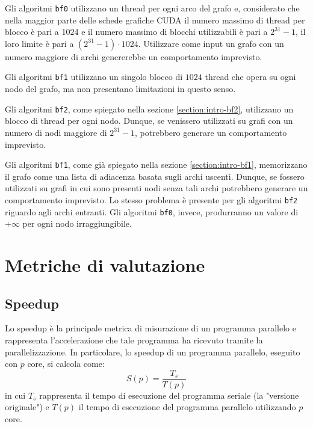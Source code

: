 \documentclass[12pt,a4paper,oneside]{book}
\begin{document}
	Gli algoritmi \texttt{bf0} utilizzano un thread per ogni arco del grafo e, considerato che nella maggior parte delle schede grafiche CUDA il numero massimo di thread per blocco è pari a 1024 e il numero massimo di blocchi utilizzabili è pari a $2^{31}-1$\cite{cudaSpecifications}, il loro limite è pari a $(2^{31}-1)\cdot 1024$. Utilizzare come input un grafo con un numero maggiore di archi genererebbe un comportamento imprevisto.
	
	Gli algoritmi \texttt{bf1} utilizzano un singolo blocco di $1024$ thread che opera su ogni nodo del grafo, ma non presentano limitazioni in questo senso.
	
	Gli algoritmi \texttt{bf2}, come spiegato nella sezione \ref{section:intro-bf2}, utilizzano un blocco di thread per ogni nodo. Dunque, se venissero utilizzati su grafi con un numero di nodi maggiore di $2^{31}-1$, potrebbero generare un comportamento imprevisto.
	
	Gli algoritmi \texttt{bf1}, come già spiegato nella sezione \ref{section:intro-bf1}, memorizzano il grafo come una lista di adiacenza basata sugli archi uscenti. Dunque, se fossero utilizzati su grafi in cui sono presenti nodi senza tali archi potrebbero generare un comportamento imprevisto. Lo stesso problema è presente per gli algoritmi \texttt{bf2} riguardo agli archi entranti. Gli algoritmi \texttt{bf0}, invece, produrranno un valore di $+\infty$ per ogni nodo irraggiungibile.
	
	\chapter{Metriche di valutazione}
	\label{chap:metriche}
	\section{Speedup}
	Lo speedup è la principale metrica di misurazione di un programma parallelo e rappresenta l'accelerazione che tale programma ha ricevuto tramite la parallelizzazione. In particolare, lo speedup di un programma parallelo, eseguito con $p$ core, si calcola come:
	\begin{equation}
		S(p) = \frac{T_s}{T(p)}
		\label{eq:speedup}
	\end{equation}
	in cui $T_s$ rappresenta il tempo di esecuzione del programma seriale (la "versione originale") e $T(p)$ il tempo di esecuzione del programma parallelo utilizzando $p$ core.
	
\end{document}
